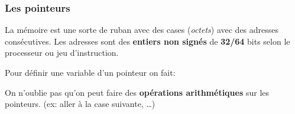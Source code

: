 \subsubsection{Les pointeurs}\label{les-pointeurs}

La mémoire est une sorte de ruban avec des cases (\emph{octets}) avec
des adresses consécutives. Les adresses sont des \textbf{entiers non
signés} de \textbf{32/64} bits selon le processeur ou jeu d'instruction.

Pour définir une variable d'un pointeur on fait:

\begin{Shaded}
\begin{Highlighting}[]
\OperatorTok{*}\OperatorTok{;} 
\OperatorTok{\&}\OperatorTok{;} 
\OperatorTok{*}\OperatorTok{;} 
\end{Highlighting}
\end{Shaded}

On n'oublie pas qu'on peut faire des \textbf{opérations arithmétiques}
sur les pointeurs. (ex: aller à la case suivante, \ldots)

\begin{Shaded}
\begin{Highlighting}[]
\OperatorTok{(}\OperatorTok{,}  \OperatorTok{**}\OperatorTok{)} \OperatorTok{\{} 
    
     \OperatorTok{**}\OperatorTok{;}\OperatorTok{=}\OperatorTok{;} 
\OperatorTok{(}\OperatorTok{);} 
    \OperatorTok{(*}\OperatorTok{!=}\OperatorTok{)} \OperatorTok{\{} 
\OperatorTok{(}\OperatorTok{,*}\OperatorTok{);} 
\OperatorTok{++;}
    \OperatorTok{\}}
\OperatorTok{(}\OperatorTok{);}
    \OperatorTok{(}\OperatorTok{);}
\OperatorTok{\}}
\end{Highlighting}
\end{Shaded}

